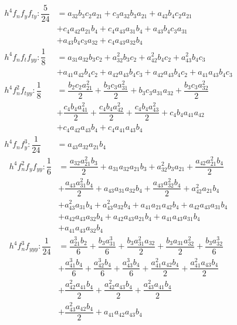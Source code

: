 \documentclass[a4paper,oneside]{book}
\numberwithin{equation}{chapter}
\begin{document}
\begin{align}
{h^4}{f_n}{f_y}{f_{ty}}:\dfrac{5}{{24}} &= {a_{32}}{b_3}{c_2}{a_{21}} + {c_3}{a_{32}}{b_3}{a_{21}} + {a_{42}}{b_4}{c_2}{a_{21}}\\
 &+ {c_4}{a_{42}}{a_{21}}{b_4} + {c_4}{a_{43}}{a_{31}}{b_4} +  {a_{43}}{b_4}{c_3}{a_{31}} \\
 &+ {a_{43}}{b_4}{c_3}{a_{32}} + {c_4}{a_{43}}{a_{32}}{b_4}\\
{h^4}{f_n}{f_t}{f_{yy}}:\dfrac{1}{8} &= {a_{31}}{a_{32}}{b_3}{c_2} + a_{32}^2{b_3}{c_2} + a_{42}^2{b_4}{c_2} + a_{43}^2{b_4}{c_3}\\
 &+ {a_{41}}{a_{42}}{b_4}{c_2} + {a_{42}}{a_{43}}{b_4}{c_3} + {a_{42}}{a_{43}}{b_4}{c_2} + {a_{41}}{a_{43}}{b_4}{c_3}\\
{h^4}f_n^2{f_{tyy}}:\dfrac{1}{8} &= \dfrac{{{b_2}{c_2}a_{21}^2}}{2} + \dfrac{{{b_3}{c_3}a_{31}^2}}{2} + {b_3}{c_3}{a_{31}}{a_{32}} + \dfrac{{{b_3}{c_3}a_{32}^2}}{2} \\
 &+ \dfrac{{{c_4}{b_4}a_{41}^2}}{2}+ \dfrac{{{c_4}{b_4}a_{42}^2}}{2} + \dfrac{{{c_4}{b_4}a_{43}^2}}{2} + {c_4}{b_4}{a_{41}}{a_{42}} \\
 &+ {c_4}{a_{42}}{a_{43}}{b_4} + {c_4}{a_{41}}{a_{43}}{b_4}\\
{h^4}{f_n}f_y^3:\dfrac{1}{{24}} &= {a_{43}}{a_{32}}{a_{21}}{b_4}
\end{align}
\begin{align}
{h^4}f_n^2{f_y}{f_{yy}}:\dfrac{1}{6} &= \dfrac{{{a_{32}}a_{21}^2{b_3}}}{2} + {a_{31}}{a_{32}}{a_{21}}{b_3} + a_{32}^2{b_3}{a_{21}} + \dfrac{{{a_{42}}a_{21}^2{b_4}}}{2}\\
 &+ \dfrac{{{a_{43}}a_{31}^2{b_4}}}{2} + {a_{43}}{a_{31}}{a_{32}}{b_4}+ \dfrac{{{a_{43}}a_{32}^2{b_4}}}{2} + a_{42}^2{a_{21}}{b_4} \\
 & + a_{43}^2{a_{31}}{b_4} + a_{43}^2{a_{32}}{b_4} + {a_{41}}{a_{21}}{a_{42}}{b_4} + {a_{42}}{a_{43}}{a_{31}}{b_4}\\
 & + {a_{42}}{a_{43}}{a_{32}}{b_4} + {a_{42}}{a_{43}}{a_{21}}{b_4} + {a_{41}}{a_{43}}{a_{31}}{b_4} \\
 &+ {a_{41}}{a_{43}}{a_{32}}{b_4}\\
{h^4}f_n^3{f_{yyy}}:\dfrac{1}{{24}} &= \dfrac{{a_{21}^3{b_2}}}{6} + \dfrac{{{b_3}a_{31}^3}}{6} + \dfrac{{{b_3}a_{31}^2{a_{32}}}}{2} + \dfrac{{{b_3}{a_{31}}a_{32}^2}}{2} + \dfrac{{{b_3}a_{32}^3}}{6}\\
 &+ \dfrac{{a_{41}^3{b_4}}}{6} + \dfrac{{a_{42}^3{b_4}}}{6} + \dfrac{{a_{43}^3{b_4}}}{6} + \dfrac{{a_{41}^2{a_{42}}{b_4}}}{2} + \dfrac{{a_{41}^2{a_{43}}{b_4}}}{2}  \\
 &+ \dfrac{{a_{42}^2{a_{41}}{b_4}}}{2}+ \dfrac{{a_{42}^2{a_{43}}{b_4}}}{2}+ \dfrac{{a_{43}^2{a_{41}}{b_4}}}{2} \\
 &+ \dfrac{{a_{43}^2{a_{42}}{b_4}}}{2} + {a_{41}}{a_{42}}{a_{43}}{b_4}
\end{align}
\end{document}
